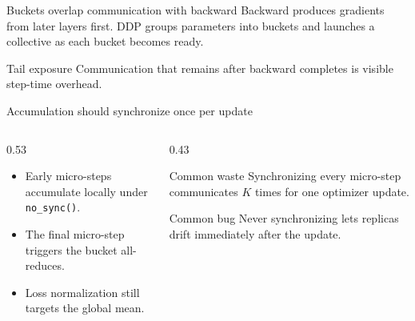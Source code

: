 \documentclass[handout]{beamer}
\begin{document}
\begin{frame}{Buckets overlap communication with backward}
  Backward produces gradients from later layers first. DDP groups parameters into buckets and launches a collective as each bucket becomes ready.
  \vspace{6pt}
  \begin{center}
  \end{center}
  \begin{alertblock}{Tail exposure}
    Communication that remains after backward completes is visible step-time overhead.
  \end{alertblock}
\end{frame}

\begin{frame}{Accumulation should synchronize once per update}
  \begin{columns}[c]
    \begin{column}{0.53\linewidth}
      \begin{itemize}
        \setlength{\itemsep}{8pt}
        \item Early micro-steps accumulate locally under \texttt{no\_sync()}.
        \item The final micro-step triggers the bucket all-reduces.
        \item Loss normalization still targets the global mean.
      \end{itemize}
    \end{column}
    \begin{column}{0.43\linewidth}
      \begin{alertblock}{Common waste}
        Synchronizing every micro-step communicates $K$ times for one optimizer update.
      \end{alertblock}
      \begin{block}{Common bug}
        Never synchronizing lets replicas drift immediately after the update.
      \end{block}
    \end{column}
  \end{columns}
\end{frame}
\end{document}
